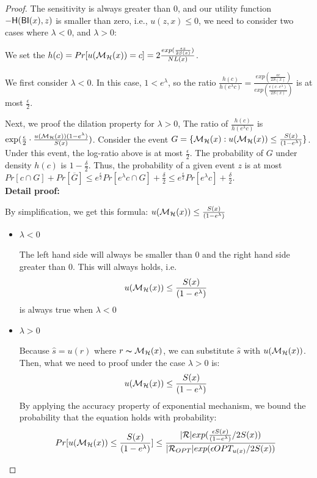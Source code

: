 \documentclass[sigconf]{acmart}
\begin{document}
\begin{proof}

The sensitivity is always greater than 0, and our utility function $-\mathsf{H}(\mathsf{BI}(x),z)$ is smaller than zero, i.e., $u(z,x) \leq 0$, we need to consider two cases where $\lambda < 0$, and $\lambda > 0$:

We set the $h(c) = Pr[u(\mathcal{M}_{\mathcal{H}}(x)) = c] = 2\frac{exp(\frac{\epsilon z}{2 S(x)})}{NL(x)}$.

We first consider $\lambda < 0$. In this case, $1 < e ^ {\lambda}$, so the ratio $\frac{h(c)}{h(e^{\lambda}c)} = \frac{exp(\frac{\epsilon c}{2 S(x)})}{exp(\frac{\epsilon (c \cdot e^{\lambda})}{2 S(x)})}$ is at most $\frac{\epsilon}{2}$.

Next, we proof the dilation property for $\lambda > 0$, The ratio of $\frac{h(c)}{h(e^{\lambda}c)}$ is $\exp(\frac{\epsilon}{2} \cdot \frac{u(\mathcal{M}_{\mathcal{H}}(x)) (1 - e^{\lambda})}{S(x)})$. Consider the event $G = \{ \mathcal{M}_{\mathcal{H}}(x) : u(\mathcal{M}_{\mathcal{H}}(x)) \leq \frac{S(x)}{(1 - e^{\lambda})}\}$. Under this event, the log-ratio above is at most $\frac{\epsilon}{2}$. The probability of $G$ under density $h(c)$ is $1 - \frac{\delta}{2}$. Thus, the probability of a given event $z$ is at most $Pr[c \cap G] + Pr[\overline{G}] \leq e^{\frac{\epsilon}{2}} Pr[e^{\lambda}c \cap G] + \frac{\delta}{2} \leq e^{\frac{\epsilon}{2}} Pr[e^{\lambda}c] + \frac{\delta}{2}$.\\


\textbf{Detail proof:}
	
	By simplification, we get this formula: $u(\mathcal{M}_{\mathcal{H}}(x)) \leq \frac{S(x)}{(1 - e ^ {\lambda})}$
\begin{itemize}
	\item $\lambda < 0$

		The left hand side will always be smaller than 0 and the right hand side greater than 0. This will always holds, i.e.
		\begin{equation*}
		u(\mathcal{M}_{\mathcal{H}}(x)) \leq \frac{S(x)}{(1 - e ^ {\lambda})}
		\end{equation*}
		is always true when $\lambda < 0$
	\item $\lambda > 0$


Because $\hat{s} = u(r)$ where $r \thicksim \mathcal{M}_{\mathcal{H}}(x)$, we can substitute $\hat{s}$ with $u(\mathcal{M}_{\mathcal{H}}(x))$. Then, what we need to proof under the case $\lambda > 0$ is:
\begin{equation*}
u(\mathcal{M}_{\mathcal{H}}(x)) \leq \frac{S(x)}{(1 - e ^ {\lambda})}
\end{equation*}
By applying the accuracy property of exponential mechanism, we bound the probability that the equation holds with probability:
\begin{equation*}
\begin{split}
Pr[u(\mathcal{M}_{\mathcal{H}}(x)) \leq \frac{S(x)}{(1 - e ^ {\lambda})}] 
& \leq \frac{|\mathcal{R}|exp(\frac{\epsilon S(x)}{(1 - e ^ {\lambda})}/2 S(x))}{|\mathcal{R}_{OPT}| exp(\epsilon OPT_{u(x)}/2 S(x))}\\
\end{split}
\end{equation*}


\end{itemize}
\end{proof}
\end{document}
